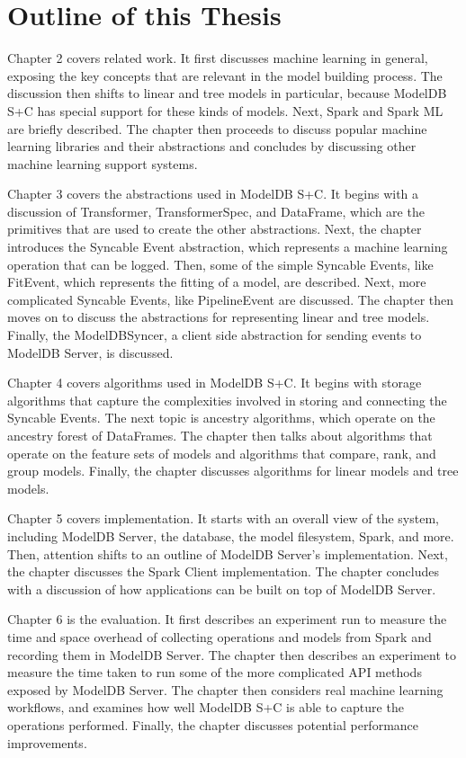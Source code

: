 \section{Outline of this Thesis}

Chapter 2 covers related work. It first discusses machine learning in general,
exposing the key concepts that are relevant in the model building process. The
discussion then shifts to linear and tree models in particular, because ModelDB S+C has 
special support for these kinds of models. 
Next, Spark and Spark ML are briefly described. The chapter then proceeds to discuss popular
machine learning libraries and their abstractions and concludes by discussing other machine
learning support systems.

Chapter 3 covers the abstractions used in ModelDB S+C.
It begins with a discussion of Transformer, TransformerSpec, and DataFrame, which are
the primitives that are used to create the other abstractions. Next, the chapter
introduces the Syncable Event abstraction, which represents a machine learning
operation that can be logged. Then, some of the simple Syncable Events, like FitEvent,
which represents the fitting of a model, are described. Next, more complicated Syncable
Events, like PipelineEvent are discussed. The chapter then moves on to discuss the
abstractions for representing linear and tree models. Finally, the ModelDBSyncer,
a client side abstraction for sending events to ModelDB Server, is discussed.

Chapter 4 covers algorithms used in ModelDB S+C. It 
begins with storage algorithms that capture the complexities involved in storing
and connecting the Syncable Events. The next topic is ancestry algorithms, which
operate on the ancestry forest of DataFrames. The chapter then talks about algorithms
that operate on the feature sets of models and algorithms that compare, rank,
and group models. Finally, the chapter discusses algorithms for linear models
and tree models.

Chapter 5 covers implementation. It starts with an overall view of the system,
including ModelDB Server, the database, the model filesystem, Spark, and more. 
Then, attention shifts to an outline of ModelDB Server's implementation. Next,
the chapter discusses the Spark Client implementation. The chapter concludes with
a discussion of how applications can be built on top of ModelDB Server.

Chapter 6 is the evaluation. It first describes an experiment run to measure the
time and space overhead of collecting operations and models from Spark and recording
them in ModelDB Server. The chapter then describes an experiment to measure
the time taken to run some of the more complicated API methods exposed by ModelDB Server.
The chapter then considers real machine learning workflows, and examines how well ModelDB S+C is
able to capture the operations performed.
Finally, the chapter discusses potential performance
improvements.

